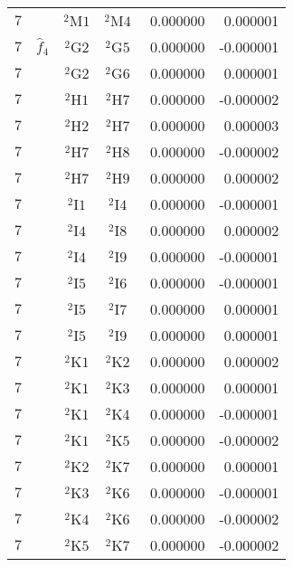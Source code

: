 \begin{longtable}{|c|c|c|c|c|c|}
    $7$ &  & ${}^{2}{\text{M1}}$ & ${}^{2}{\text{M4}}$ & \,\,0.000000 & \,\,0.000001 \\
    $7$ & $\hat{f}_4$ & ${}^{2}{\text{G2}}$ & ${}^{2}{\text{G5}}$ & \,\,0.000000 & -0.000001 \\
    $7$ &  & ${}^{2}{\text{G2}}$ & ${}^{2}{\text{G6}}$ & \,\,0.000000 & \,\,0.000001 \\
    $7$ &  & ${}^{2}{\text{H1}}$ & ${}^{2}{\text{H7}}$ & \,\,0.000000 & -0.000002 \\
    $7$ &  & ${}^{2}{\text{H2}}$ & ${}^{2}{\text{H7}}$ & \,\,0.000000 & \,\,0.000003 \\
    $7$ &  & ${}^{2}{\text{H7}}$ & ${}^{2}{\text{H8}}$ & \,\,0.000000 & -0.000002 \\
    $7$ &  & ${}^{2}{\text{H7}}$ & ${}^{2}{\text{H9}}$ & \,\,0.000000 & \,\,0.000002 \\
    $7$ &  & ${}^{2}{\text{I1}}$ & ${}^{2}{\text{I4}}$ & \,\,0.000000 & -0.000001 \\
    $7$ &  & ${}^{2}{\text{I4}}$ & ${}^{2}{\text{I8}}$ & \,\,0.000000 & \,\,0.000002 \\
    $7$ &  & ${}^{2}{\text{I4}}$ & ${}^{2}{\text{I9}}$ & \,\,0.000000 & -0.000001 \\
    $7$ &  & ${}^{2}{\text{I5}}$ & ${}^{2}{\text{I6}}$ & \,\,0.000000 & -0.000001 \\
    $7$ &  & ${}^{2}{\text{I5}}$ & ${}^{2}{\text{I7}}$ & \,\,0.000000 & \,\,0.000001 \\
    $7$ &  & ${}^{2}{\text{I5}}$ & ${}^{2}{\text{I9}}$ & \,\,0.000000 & \,\,0.000001 \\
    $7$ &  & ${}^{2}{\text{K1}}$ & ${}^{2}{\text{K2}}$ & \,\,0.000000 & \,\,0.000002 \\
    $7$ &  & ${}^{2}{\text{K1}}$ & ${}^{2}{\text{K3}}$ & \,\,0.000000 & \,\,0.000001 \\
    $7$ &  & ${}^{2}{\text{K1}}$ & ${}^{2}{\text{K4}}$ & \,\,0.000000 & -0.000001 \\
    $7$ &  & ${}^{2}{\text{K1}}$ & ${}^{2}{\text{K5}}$ & \,\,0.000000 & -0.000002 \\
    $7$ &  & ${}^{2}{\text{K2}}$ & ${}^{2}{\text{K7}}$ & \,\,0.000000 & \,\,0.000001 \\
    $7$ &  & ${}^{2}{\text{K3}}$ & ${}^{2}{\text{K6}}$ & \,\,0.000000 & -0.000001 \\
    $7$ &  & ${}^{2}{\text{K4}}$ & ${}^{2}{\text{K6}}$ & \,\,0.000000 & -0.000002 \\
    $7$ &  & ${}^{2}{\text{K5}}$ & ${}^{2}{\text{K7}}$ & \,\,0.000000 & -0.000002 \\

\end{longtable}
